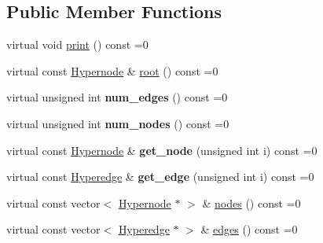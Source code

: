\subsection*{Public Member Functions}
\begin{DoxyCompactItemize}
\item 
virtual void \hyperlink{class_scarab_1_1_h_g_1_1_h_graph_ab5aa11c932b28864b56f28e0babbc1c1}{print} () const =0
\item 
virtual const \hyperlink{class_scarab_1_1_h_g_1_1_hypernode}{Hypernode} \& \hyperlink{class_scarab_1_1_h_g_1_1_h_graph_a5ede392b158e41dd7e95ded1c4b0b5d6}{root} () const =0
\item 
\hypertarget{class_scarab_1_1_h_g_1_1_h_graph_a8309003db80be5bdbe4bb64f98a78ea8}{
virtual unsigned int {\bfseries num\_\-edges} () const =0}
\label{class_scarab_1_1_h_g_1_1_h_graph_a8309003db80be5bdbe4bb64f98a78ea8}

\item 
\hypertarget{class_scarab_1_1_h_g_1_1_h_graph_a6f4d37ef034cb38aa09c702b80a6e4f7}{
virtual unsigned int {\bfseries num\_\-nodes} () const =0}
\label{class_scarab_1_1_h_g_1_1_h_graph_a6f4d37ef034cb38aa09c702b80a6e4f7}

\item 
\hypertarget{class_scarab_1_1_h_g_1_1_h_graph_acad57dd952956b1a1a4367bba0e9383b}{
virtual const \hyperlink{class_scarab_1_1_h_g_1_1_hypernode}{Hypernode} \& {\bfseries get\_\-node} (unsigned int i) const =0}
\label{class_scarab_1_1_h_g_1_1_h_graph_acad57dd952956b1a1a4367bba0e9383b}

\item 
\hypertarget{class_scarab_1_1_h_g_1_1_h_graph_aa599b296ae01affc9606f519e4e44e9e}{
virtual const \hyperlink{class_scarab_1_1_h_g_1_1_hyperedge}{Hyperedge} \& {\bfseries get\_\-edge} (unsigned int i) const =0}
\label{class_scarab_1_1_h_g_1_1_h_graph_aa599b296ae01affc9606f519e4e44e9e}

\item 
virtual const vector$<$ \hyperlink{class_scarab_1_1_h_g_1_1_hypernode}{Hypernode} $\ast$ $>$ \& \hyperlink{class_scarab_1_1_h_g_1_1_h_graph_a74d893fba015520774f71f02a46bb6ca}{nodes} () const =0
\item 
virtual const vector$<$ \hyperlink{class_scarab_1_1_h_g_1_1_hyperedge}{Hyperedge} $\ast$ $>$ \& \hyperlink{class_scarab_1_1_h_g_1_1_h_graph_a57328729f90cc4152ca79ff15ecdd4bb}{edges} () const =0
\end{DoxyCompactItemize}


